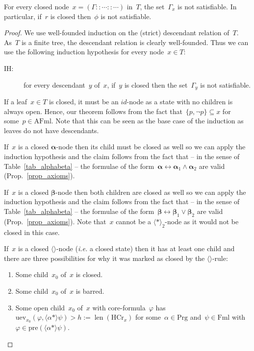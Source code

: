 \documentclass{entcs}
\newcommand{\ie}{\emph{i.e.}}
\newcommand{\pnot}[1]{\lnot #1}
\newcommand{\pand}[2]{#1 \land #2}
\newcommand{\por}[2]{#1 \lor #2}
\newcommand{\pea}[2]{\langle#1\rangle #2}
\newcommand{\prp}[1]{#1*}
\newcommand{\peq}[2]{#1 \leftrightarrow #2}
\newcommand{\fml}{\mathrm{Fml}}
\newcommand{\prg}{\mathrm{Prg}}
\newcommand{\proptn}{\mathrm{AFml}}
\newcommand{\ppre}[1]{\mathrm{pre}(#1)}
\newcommand{\tnode}[3]{(#1 :: #2 :: #3)}
\newcommand{\thc}{\mathrm{HCr}}
\newcommand{\tuev}{\mathrm{uev}}
\newcommand{\talpha}{\boldsymbol{\alpha}}
\newcommand{\tbeta}{\boldsymbol{\beta}}
\newcommand{\trid}{$id$}
\newcommand{\trert}{$\pea{\prp{}}{}_2$}
\newcommand{\trea}{$\langle\rangle$}
\newcommand{\llen}{\mathop{\mathrm{len}}}
\begin{document}
\begin{lemma}
  \label{lemma_marked}
  For every closed node~$x = \tnode{\Gamma}{\dotsb}{\dotsb}$ in~$T$,
  the set~$\Gamma_x$ is not satisfiable.
  In particular, if~$r$ is closed then~$\phi$ is not satisfiable.
\end{lemma}
\begin{proof}
  We use well-founded induction on the (strict) descendant relation of~$T$.
  As~$T$ is a finite tree, the descendant relation is clearly well-founded.
  Thus we can use the following induction hypothesis for every node~$x \in T$:
  \begin{description}
  \item[IH:] for every descendant~$y$ of~$x$,
    if~$y$ is closed then the set~$\Gamma_y$ is not satisfiable.
  \end{description}

  If a leaf~$x \in T$ is closed,
  it must be an \trid{}-node
  as a state with no children is always open.
  Hence, our theorem follows from the fact
  that~$\{ p, \pnot{p} \} \subseteq x$ for some~$p \in \proptn$.
  Note that this can be seen as the base case of the induction
  as leaves do not have descendants.

  If~$x$ is a closed $\talpha$-node
  then its child must be closed as well
  so we can apply the induction hypothesis
  and the claim follows from the fact
  that -- in the sense of Table~\ref{tab_alphabeta} --
  the formulae of the form~$\peq{\talpha}{\pand{\talpha_1}{\talpha_2}}$ are valid
  (Prop.~\ref{prop_axioms}).

  If~$x$ is a closed $\tbeta$-node
  then both children are closed as well
  so we can apply the induction hypothesis
  and the claim follows from the fact
  that -- in the sense of Table~\ref{tab_alphabeta} --
  the formulae of the form~$\peq{\tbeta}{\por{\tbeta_1}{\tbeta_2}}$ are valid
  (Prop.~\ref{prop_axioms}).
  Note that~$x$ cannot be a \trert{}-node as it would not be closed in this case.

  If~$x$ is a closed \trea{}-node
  (\ie{} a closed state)
  then it has at least one child and there are three possibilities
  for why it was marked as closed by the \trea{}-rule:
  \renewcommand{\theenumi}{(\arabic{enumi})}
  \renewcommand{\labelenumi}{\theenumi}
  \begin{enumerate}
  \item Some child~$x_0$ of~$x$ is closed.
  \item Some child~$x_0$ of~$x$ is barred.
  \item Some open child~$x_0$ of~$x$ with core-formula~$\varphi$
    has $\tuev_{x_0}(\varphi, \pea{\prp{\alpha}}{\psi}) > h := \llen(\thc_x)$
    for some~$\alpha \in \prg$ and~$\psi \in \fml$ with~$\varphi \in \ppre{\pea{\prp{\alpha}}{\psi}}$.
  \end{enumerate}


\end{proof}
\end{document}
